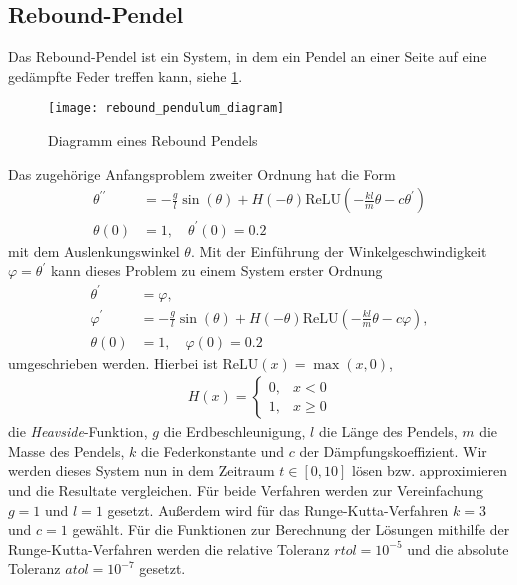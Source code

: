 \subsection{Rebound-Pendel}
\label{subsec:rebound-Pendel}
Das Rebound-Pendel ist ein System, in dem ein Pendel an einer Seite auf eine gedämpfte Feder treffen kann, siehe
\ref{fig:rebound_pendulum_diagram}.
\begin{figure}
       \centering
       \texttt{[image: rebound\_pendulum\_diagram]}
       \caption{Diagramm eines Rebound Pendels\cite[6]{flamantSolvingDifferentialEquations2020}}
       \label{fig:rebound_pendulum_diagram}
\end{figure}
Das zugehörige Anfangsproblem zweiter Ordnung hat die Form
\begin{align*}
       \theta^{\prime \prime} &= - \frac{g}{l} \sin(\theta) + H(-\theta)
       \text{ReLU}(-\frac{kl}{m}\theta - c \theta^{\prime})\\
       \theta(0) &= 1, \quad \theta^{\prime}(0)=0.2
\end{align*}
mit dem Auslenkungswinkel $\theta$. Mit der Einführung der Winkelgeschwindigkeit $\varphi=\theta^{\prime}$ kann dieses
Problem zu einem System erster Ordnung
\begin{align}
       \theta^{\prime} &= \varphi, \nonumber \\
       \varphi^{\prime} &= - \frac{g}{l} \sin(\theta) + H(-\theta)
       \text{ReLU}(-\frac{kl}{m}\theta - c \varphi), \label{rebound-pendulum}\\
       \theta(0) &= 1, \quad \varphi(0)=0.2 \nonumber
\end{align}
umgeschrieben werden. Hierbei ist $\text{ReLU}(x)= \max(x, 0)$,
\begin{align*}
       H(x) =
       \begin{cases}
              0, &x<0 \\
              1, &x \geq 0
       \end{cases}
\end{align*}
die \textit{Heavside}-Funktion,
$g$ die Erdbeschleunigung, $l$ die Länge des Pendels, $m$ die Masse des Pendels, $k$ die Federkonstante und $c$ der
Dämpfungskoeffizient. Wir werden dieses System nun in dem Zeitraum $t \in [0, 10]$ lösen bzw. approximieren und die
Resultate vergleichen. Für beide Verfahren werden zur Vereinfachung $g=1$ und $l=1$ gesetzt. Außerdem wird für das
Runge-Kutta-Verfahren $k=3$ und $c=1$ gewählt. Für die Funktionen zur Berechnung der Lösungen mithilfe der
Runge-Kutta-Verfahren werden die relative Toleranz $rtol=10^{-5}$ und die absolute Toleranz $atol=10^{-7}$ gesetzt.
